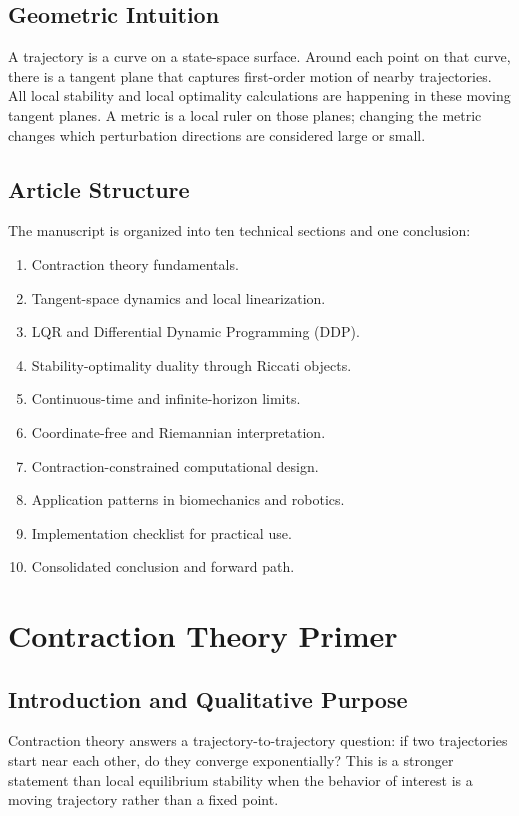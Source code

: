 \documentclass[11pt,letterpaper]{article}
\begin{document}
\subsection{Geometric Intuition}
A trajectory is a curve on a state-space surface. Around each point on that curve, there is a tangent plane that captures first-order motion of nearby trajectories. All local stability and local optimality calculations are happening in these moving tangent planes. A metric is a local ruler on those planes; changing the metric changes which perturbation directions are considered large or small.

\subsection{Article Structure}
The manuscript is organized into ten technical sections and one conclusion:
\begin{enumerate}[label=\arabic*.]
\item Contraction theory fundamentals.
\item Tangent-space dynamics and local linearization.
\item LQR and Differential Dynamic Programming (DDP).
\item Stability-optimality duality through Riccati objects.
\item Continuous-time and infinite-horizon limits.
\item Coordinate-free and Riemannian interpretation.
\item Contraction-constrained computational design.
\item Application patterns in biomechanics and robotics.
\item Implementation checklist for practical use.
\item Consolidated conclusion and forward path.
\end{enumerate}

\section{Contraction Theory Primer}

\subsection{Introduction and Qualitative Purpose}
Contraction theory answers a trajectory-to-trajectory question: if two trajectories start near each other, do they converge exponentially? This is a stronger statement than local equilibrium stability when the behavior of interest is a moving trajectory rather than a fixed point.
\end{document}
